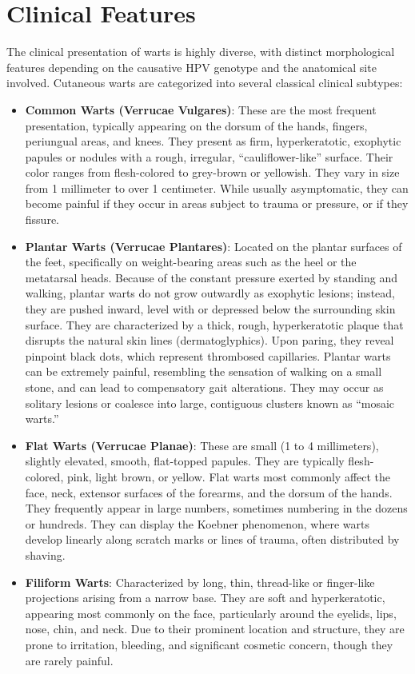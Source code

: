 \section*{Clinical Features}
The clinical presentation of warts is highly diverse, with distinct morphological features depending on the causative HPV genotype and the anatomical site involved. Cutaneous warts are categorized into several classical clinical subtypes:
\begin{itemize}
    \item \textbf{Common Warts (Verrucae Vulgares)}: These are the most frequent presentation, typically appearing on the dorsum of the hands, fingers, periungual areas, and knees. They present as firm, hyperkeratotic, exophytic papules or nodules with a rough, irregular, ``cauliflower-like'' surface. Their color ranges from flesh-colored to grey-brown or yellowish. They vary in size from 1 millimeter to over 1 centimeter. While usually asymptomatic, they can become painful if they occur in areas subject to trauma or pressure, or if they fissure.
    \item \textbf{Plantar Warts (Verrucae Plantares)}: Located on the plantar surfaces of the feet, specifically on weight-bearing areas such as the heel or the metatarsal heads. Because of the constant pressure exerted by standing and walking, plantar warts do not grow outwardly as exophytic lesions; instead, they are pushed inward, level with or depressed below the surrounding skin surface. They are characterized by a thick, rough, hyperkeratotic plaque that disrupts the natural skin lines (dermatoglyphics). Upon paring, they reveal pinpoint black dots, which represent thrombosed capillaries. Plantar warts can be extremely painful, resembling the sensation of walking on a small stone, and can lead to compensatory gait alterations. They may occur as solitary lesions or coalesce into large, contiguous clusters known as ``mosaic warts.''
    \item \textbf{Flat Warts (Verrucae Planae)}: These are small (1 to 4 millimeters), slightly elevated, smooth, flat-topped papules. They are typically flesh-colored, pink, light brown, or yellow. Flat warts most commonly affect the face, neck, extensor surfaces of the forearms, and the dorsum of the hands. They frequently appear in large numbers, sometimes numbering in the dozens or hundreds. They can display the Koebner phenomenon, where warts develop linearly along scratch marks or lines of trauma, often distributed by shaving.
    \item \textbf{Filiform Warts}: Characterized by long, thin, thread-like or finger-like projections arising from a narrow base. They are soft and hyperkeratotic, appearing most commonly on the face, particularly around the eyelids, lips, nose, chin, and neck. Due to their prominent location and structure, they are prone to irritation, bleeding, and significant cosmetic concern, though they are rarely painful.

\end{itemize}
